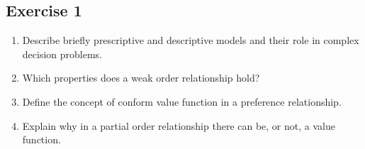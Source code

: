 \documentclass[\main/main.tex]{subfiles}
\begin{document}
\subsection{Exercise 1}
\begin{enumerate}
  \item Describe briefly prescriptive and descriptive models and their role in complex decision problems.
  \item Which properties does a weak order relationship hold?
  \item Define the concept of conform value function in a preference relationship.
  \item Explain why in a partial order relationship there can be, or not, a value function.
\end{enumerate}
\end{document}
